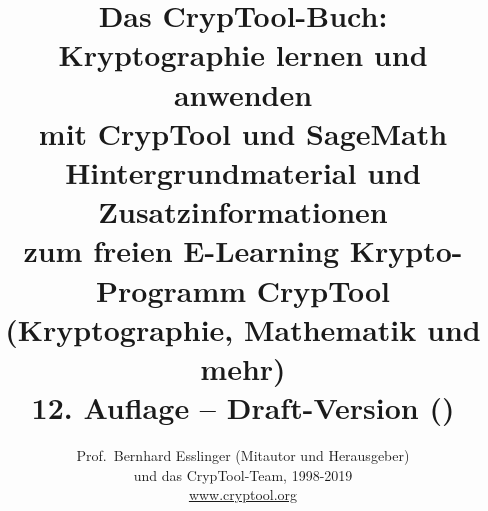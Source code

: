 \setlength{\fboxrule}{.5mm}
\setlength{\fboxsep}{1.75mm}
\setlength{\footnotesep}{6pt}
\addtolength{\footskip}{8pt}

\title{%
	{\Huge Das CrypTool-Buch:\\[20pt]
	       {\bf Kryptographie lernen und anwenden\\[15pt]
                mit CrypTool und SageMath}} \\[35pt]
	{\LARGE Hintergrundmaterial und Zusatzinformationen\\
	 zum freien E-Learning Krypto-Programm CrypTool\\[5pt]
	 (Kryptographie, Mathematik und mehr)} \\[35pt]
	 {\large 12. Auflage --  {\bf Draft-Version} (\currenttime)}
}%

\author{%
	{\LARGE Prof.\ Bernhard Esslinger (Mitautor und Herausgeber)}\\[10pt]
	{\LARGE und das CrypTool-Team, 1998-2019}\\[10pt]
	\url{www.cryptool.org}
}%

\usepackage{xurl}
\setcounter{biburllcpenalty}{1} \setcounter{biburlucpenalty}{1} \setcounter{biburlnumpenalty}{1}
\usepackage[colorlinks=true,linkcolor=blue,citecolor=blue,urlcolor=cyan, %
bookmarksnumbered=true,pdfpagelabels,plainpages=false,%
hyperfootnotes=false]{hyperref}




%

